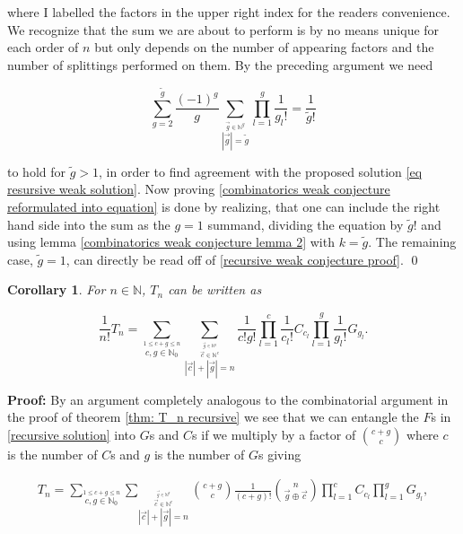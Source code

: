 \documentclass[b5paper,draft,openbib,12pt]{memoir}
\newtheorem{Corollary}[Def]{Corollary}
\begin{document}
where I labelled the factors in the upper right index for the readers convenience. We recognize
that the sum we are about to perform is by no means unique for each order of \(n\) but only 
depends on the number of appearing factors and the number of splittings performed on
them. By the preceding argument we need 

\begin{equation}\label{combinatorics weak conjecture reformulated into equation}
\sum_{g=2}^{\tilde{g}} \frac{(-1)^g}{g} \sum_{\stackrel{\vec{g}\in\mathbb{N}^g}{|\vec{g}|=\tilde{g}}} \prod_{l=1}^g \frac{1}{g_l!}
= \frac{1}{\tilde{g}!} 
\end{equation}


to hold for \(\tilde{g}>1\), in order to find agreement with the proposed solution \eqref{eq resursive weak solution}.
Now proving \eqref{combinatorics weak conjecture reformulated into equation} is done by 
realizing, that one can include the right hand side into the sum as the \(g=1\) summand, dividing
the equation by \(\tilde{g}!\) and using lemma \ref{combinatorics weak conjecture lemma 2}
with \(k=\tilde{g}\). The remaining case, \(\tilde{g}=1\), can directly be
read off of \eqref{recursive weak conjecture proof}. \qed

\begin{Corollary}\label{Corollary T_n by G's and C's}
For \(n\in\mathbb{N}\), \(T_n\) can be written as

\begin{equation}
\frac{1}{n!} T_n = \sum_{\stackrel{1\le c+g\le n}{c,g\in\mathbb{N}_0}} 
\sum_{\stackrel{\stackrel{\vec{g}\in\mathbb{N}^g}{\vec{c}\in\mathbb{N}^c}}{|\vec{c}| + |\vec{g}|=n}} 
\frac{1}{c! g!} \prod_{l=1}^c \frac{1}{c_l!} C_{c_l} \prod_{l=1}^g \frac{1}{g_l!} G_{g_l}.
\end{equation}
\end{Corollary}
\textbf{Proof:} By an argument completely analogous to the combinatorial argument in the proof of theorem 
\eqref{thm: T_n recursive} we see that we can entangle the \(F\)s in \eqref{recursive solution}
into \(G\)s and \(C\)s if we multiply by a factor of \(\binom{c+g}{c}\) where \(c\) is the 
number of \(C\)s and \(g\) is the number of \(G\)s giving

\begin{multline}
T_n = \sum_{\stackrel{1\le c+g\le n}{c,g\in\mathbb{N}_0}}
\sum_{\stackrel{\stackrel{\vec{g}\in\mathbb{N}^g}{\vec{c}\in\mathbb{N}^c}}{|\vec{c}| + |\vec{g}|=n}} 
\binom{c+g}{c} \frac{1}{(c+g)!} \binom{n}{\vec{g}\oplus \vec{c}}
\prod_{l=1}^c  C_{c_l} \prod_{l=1}^g G_{g_l},
\end{multline}
\end{document}
